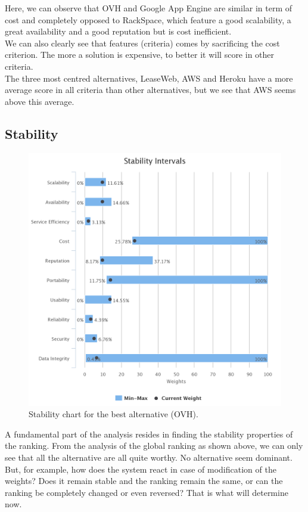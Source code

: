 \documentclass[a4paper,11pt]{article}
\begin{document}
Here, we can observe that OVH and Google App Engine are similar in term of cost and completely opposed to RackSpace, which feature a good scalability, a great availability and a good reputation but is cost inefficient. \\

We can also clearly see that features (criteria) comes by sacrificing the \og cost \fg{} criterion. The more a solution is expensive, to better it will score in other criteria.\\

The three most centred alternatives, LeaseWeb, AWS and Heroku have a more average score in all criteria than other alternatives, but we see that AWS seems above this average.\\

\subsection{Stability}

\begin{figure}
  \centering
  \includegraphics[width=\textwidth]{img/Result/stability_chart.png}
  \caption{Stability chart for the best alternative (OVH).}
  \label{fig:stab}
\end{figure}

A fundamental part of the analysis resides in finding the stability properties of the ranking. From the analysis of the global ranking as shown above, we can only see that all the alternative are all quite worthy. No alternative seem dominant. But, for example, how does the system react in case of modification of the weights? Does it remain stable and the ranking remain the same, or can the ranking be completely changed or even reversed? That is what will determine now.\\
\end{document}
